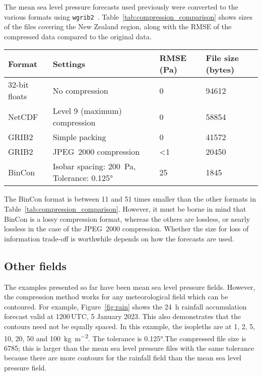 \documentclass[12pt,a4paper]{article}
\begin{document}
The mean sea level pressure forecasts used previously were converted to the
various formats using \texttt{wgrib2}~\citep{noaa2021}.
Table~\ref{tab:compression_comparison} shows sizes of the files covering the
New Zealand region, along with the RMSE of the compressed data compared to the
original data.

\begin{table*}
\centering
\begin{tabular}{llll} \hline
Format			& Settings																& RMSE (Pa)	& File size (bytes)	\\ \hline
32-bit floats	& No compression														& 0			& \num{94612}			\\
NetCDF			& Level 9 (maximum) compression									& 0			& \num{58854}			\\
GRIB2				& Simple packing														& 0			& \num{41572}			\\
GRIB2				& JPEG~2000 compression												& <1			& \num{20450}			\\
BinCon			& Isobar spacing: \SI{200}{\Pa}, Tolerance: \ang{0.125}	& 25			& \num{1845}			\\\hline
\end{tabular}
\caption{\label{tab:compression_comparison}Comparison of file sizes for commonly used
data formats.}
\end{table*}

The BinCon format is between 11 and 51 times smaller than the other formats in
Table~\ref{tab:compression_comparison}. However, it must be borne in mind that
BinCon is a lossy compression format, whereas the others are lossless, or
nearly lossless in the case of the JPEG~2000 compression. Whether the size for
loss of information trade-off is worthwhile depends on how the forecasts are
used.

\subsection*{Other fields}
\label{sec:other_fields}

The examples presented so far have been mean sea level pressure fields.
However, the compression method works for any meteorological field which can be
contoured. For example, Figure~\ref{fig:rain} shows the \SI{24}{\hour} rainfall
accumulation forecast valid at 1200\,UTC, 5 January 2023. This also demonstrates
that the contours need not be equally spaced. In this example, the isopleths are
at 1, 2, 5, 10, 20, 50 and \SI{100}{\kg\per\m\squared}. The tolerance is
\ang{0.125}.The compressed file size is \SI{6785}{\byte}; this is larger than
the mean sea level pressure files with the same tolerance because there are
more contours for the rainfall field than the mean sea level pressure field.
\end{document}
